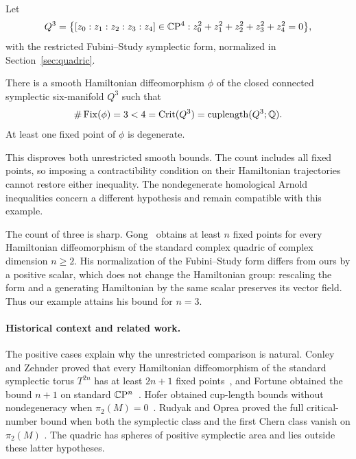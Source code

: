 Let
\begin{equation}\label{eq:quadric}
 Q^3=\bigl\{[z_0:z_1:z_2:z_3:z_4]\in\mathbb C\mathrm P^4:
                 z_0^2+z_1^2+z_2^2+z_3^2+z_4^2=0\bigr\},
\end{equation}
with the restricted Fubini--Study symplectic form, normalized in
Section~\ref{sec:quadric}.

\begin{theorem}\label{thm:counterexample}
There is a smooth Hamiltonian diffeomorphism $\phi$ of the closed connected
symplectic six-manifold $Q^3$ such that
\begin{equation}\label{eq:counterexample}
 \#\operatorname{Fix}(\phi)=3<4=\operatorname{Crit}(Q^3)
                  =\operatorname{cuplength}(Q^3;\mathbb Q).
\end{equation}
At least one fixed point of $\phi$ is degenerate.
\end{theorem}

This disproves both unrestricted smooth bounds. The count includes all
fixed points, so imposing a contractibility condition on their
Hamiltonian trajectories cannot restore either inequality. The
nondegenerate homological Arnold inequalities concern a different
hypothesis and remain compatible with this example.

The count of three is sharp. Gong~\cite[Section~1.1.1]{Gong2025}
obtains at least $n$ fixed points for every Hamiltonian diffeomorphism
of the standard complex quadric of complex dimension $n\ge2$.
His normalization of the Fubini--Study form differs from ours by a
positive scalar, which does not change the Hamiltonian group: rescaling
the form and a generating Hamiltonian by the same scalar preserves its
vector field. Thus our example attains his bound for $n=3$.

\paragraph{Historical context and related work.}
The positive cases explain why the unrestricted comparison is natural.
Conley and Zehnder proved that every Hamiltonian diffeomorphism of the
standard symplectic torus $T^{2n}$ has at least $2n+1$ fixed
points~\cite{ConleyZehnder1983}, and Fortune obtained the bound $n+1$
on standard $\mathbb C\mathrm P^n$~\cite{Fortune1985}. Hofer obtained cup-length bounds without
nondegeneracy when $\pi_2(M)=0$~\cite[Theorem~4]{Hofer1988}.
Rudyak and Oprea proved the full critical-number bound when both the
symplectic class and the first Chern class vanish on $\pi_2(M)$
\cite[Corollary~4.3]{RudyakOprea1999}. The quadric has spheres of
positive symplectic area and lies outside these latter hypotheses.

